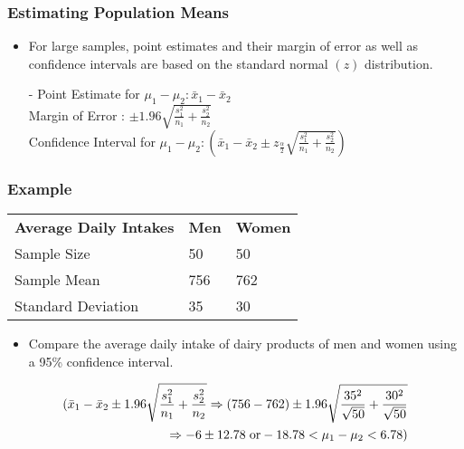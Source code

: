 \documentclass[12pt, letterpaper]{article}
\begin{document}
            \subsubsection{Estimating Population Means}
                \begin{itemize}
                    \item For large samples, point estimates and their margin of error as well as confidence intervals are based on the standard normal $(z)$ distribution.
                    \item[-] Point Estimate for $\mu_1-\mu_2 : \bar{x}_1-\bar{x}_2$ \\ Margin of Error : $\pm 1.96\sqrt{\frac{s^2_1}{n_1} + \frac{s^2_2}{n_2}}$ \\ Confidence Interval for $\mu_1-\mu_2 : (\bar{x}_1-\bar{x}_2\pm z_{\frac{\alpha}{2}}\sqrt{\frac{s^2_1}{n_1} + \frac{s^2_2}{n_2}})$
                \end{itemize}
            \subsubsection*{Example}
                \begin{tabular}{|l|l|l|}
                    \cline{1-3}
                    \textbf{Average Daily Intakes} & \textbf{Men} & \textbf{Women} \\ \cline{1-3}
                    Sample Size & 50 & 50 \\ \cline{1-3}
                    Sample Mean & 756 & 762 \\ \cline{1-3}
                    Standard Deviation & 35 & 30 \\ \cline{1-3}
                \end{tabular}
                \begin{itemize}
                    \item Compare the average daily intake of dairy products of men and women using a 95\% confidence interval.
                \end{itemize}
                \begin{mdframed}[leftmargin=0.5cm, rightmargin=0.5cm]
                    \begin{align*}
                        (\bar{x}_1 - \bar{x}_2\pm 1.96\sqrt{\frac{s^2_1}{n_1} + \frac{s^2_2}{n_2}} \Rightarrow (756 - 762)\pm 1.96\sqrt{\frac{35^2}{\sqrt{50}} + \frac{30^2}{\sqrt{50}}} \\ \Rightarrow -6\pm 12.78 \hspace{3pt} \textnormal{or} -18.78 < \mu_1 - \mu_2 < 6.78)
                    \end{align*}
                \end{mdframed}
\end{document}
